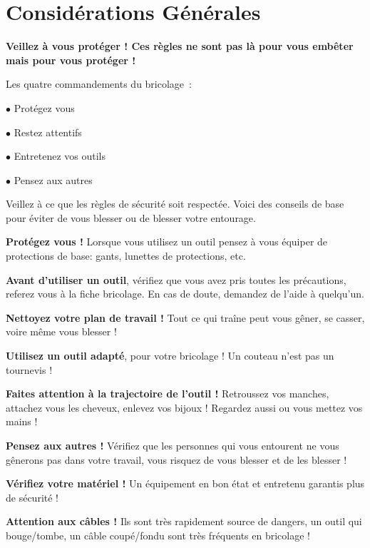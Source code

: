 \section*{Considérations Générales}
\textbf{Veillez à vous protéger ! Ces règles ne sont pas là pour vous embêter mais pour vous protéger !}

Les quatre commandements du bricolage~:

\begin{minipage}{0.45\columnwidth}
\begin{center}
$\bullet$ {\tailleRegles Protégez vous}

$\bullet$ {\tailleRegles Restez attentifs}
\end{center}
\end{minipage}
\begin{minipage}{0.53\columnwidth}
\begin{center}
$\bullet$ {\tailleRegles Entretenez vos outils}

$\bullet$ {\tailleRegles Pensez aux autres}
\end{center}
\end{minipage}

\vspace{0.05\columnwidth}

Veillez à ce que les règles de sécurité soit respectée. Voici des conseils de base pour éviter de vous blesser ou de blesser votre entourage.

\textbf{Protégez vous !} Lorsque vous utilisez un outil pensez à vous équiper de protections de base: gants, lunettes de protections, etc.

\textbf{Avant d'utiliser un outil}, vérifiez que vous avez pris toutes les précautions, referez vous à la fiche bricolage. En cas de doute, demandez de l'aide à quelqu'un.

\textbf{Nettoyez votre plan de travail !} Tout ce qui traîne peut vous gêner, se casser, voire même vous blesser !

\textbf{Utilisez un outil adapté}, pour votre bricolage ! Un couteau n'est pas un tournevis !

\textbf{Faites attention à la trajectoire de l'outil !} Retroussez vos manches, attachez vous les cheveux, enlevez vos bijoux ! Regardez aussi ou vous mettez vos mains !

\textbf{Pensez aux autres !} Vérifiez que les personnes qui vous entourent ne vous gênerons pas dans votre travail, vous risquez de vous blesser et de les blesser !

\textbf{Vérifiez votre matériel !} Un équipement en bon état et entretenu garantis plus de sécurité !

\textbf{Attention aux câbles !} Ils sont très rapidement source de dangers, un outil qui bouge/tombe, un câble coupé/fondu sont très fréquents en bricolage !
